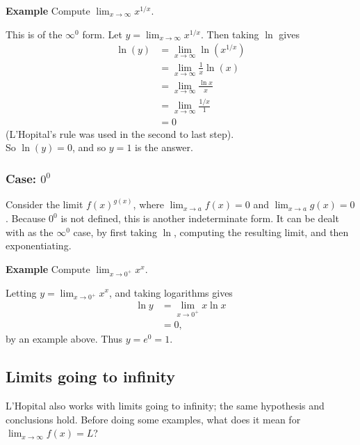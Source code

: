 \documentclass[twoside,openright,titlepage,a4paper]{book}
\begin{document}
\begin{sloppypar}
\textbf{Example} Compute $\displaystyle \lim_{x \rightarrow \infty} x^{1/x}$. 
\begin{examplebox}
This is of the $\infty^0$ form. Let $\displaystyle y = \lim_{x \rightarrow \infty} x^{1/x}$. Then taking $\ln$ gives
\begin{align*}
\ln(y) &= \lim_{x \rightarrow \infty} \ln\left(x^{1/x}\right) \\
&= \lim_{x \rightarrow \infty} \frac{1}{x}\ln(x) \\
&= \lim_{x \rightarrow \infty} \frac{\ln x}{x} \\
&= \lim_{x \rightarrow \infty} \frac{1/x}{1} \\
&= 0 
\end{align*}
(L'Hopital's rule was used in the second to last step).\\
So $\ln(y) = 0$, and so $y = 1$ is the answer.
\end{examplebox}

\subsubsection{Case: $0^0$}

Consider the limit $\displaystyle f(x)^{g\left(x\right)}$, where $\displaystyle \lim_{x \rightarrow a} f(x) = 0$ and $\displaystyle \lim_{x \rightarrow a} g(x) = 0$. Because $0^0$ is not defined, this is another indeterminate form. It can be dealt with as the $\infty^0$ case, by first taking $\ln$, computing the resulting limit, and then exponentiating.

\textbf{Example} Compute $\displaystyle \lim_{x \rightarrow 0^+} x^x$. 
\begin{examplebox}
Letting $\displaystyle y = \lim_{x \rightarrow 0^+} x^x$, and taking logarithms gives
\begin{align*}
\ln y &= \lim_{x \rightarrow 0^+} x \ln x \\
&= 0, 
\end{align*}
by an example above. Thus $y = e^0 = 1$.
\end{examplebox}

\subsection{Limits going to infinity}

L'Hopital also works with limits going to infinity; the same hypothesis and conclusions hold. Before doing some examples, what does it mean for $\displaystyle \lim_{x \rightarrow \infty} f(x) = L$?


\end{sloppypar}
\end{document}
